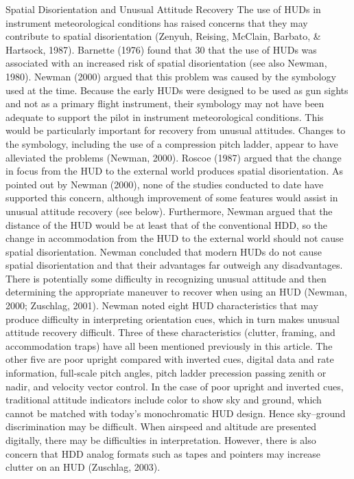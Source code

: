 \documentclass[utf8,bachelor,manualbib]{gradu3}
\begin{document}
Spatial Disorientation and Unusual Attitude Recovery
The use of HUDs in instrument meteorological conditions has raised concerns
that they may contribute to spatial disorientation (Zenyuh, Reising, McClain,
Barbato, \& Hartsock, 1987). Barnette (1976) found that 30%
that the use of HUDs was associated with an increased risk of spatial disorientation
(see also Newman, 1980). Newman (2000) argued that this problem was
caused by the symbology used at the time. Because the early HUDs were designed
to be used as gun sights and not as a primary flight instrument, their
symbology may not have been adequate to support the pilot in instrument meteorological
conditions. This would be particularly important for recovery from
unusual attitudes. Changes to the symbology, including the use of a compression
pitch ladder, appear to have alleviated the problems (Newman, 2000).
Roscoe (1987) argued that the change in focus from the HUD to the external
world produces spatial disorientation. As pointed out by Newman (2000), none
of the studies conducted to date have supported this concern, although improvement
of some features would assist in unusual attitude recovery (see below).
Furthermore, Newman argued that the distance of the HUD would be at least
that of the conventional HDD, so the change in accommodation from the HUD
to the external world should not cause spatial disorientation. Newman concluded
that modern HUDs do not cause spatial disorientation and that their advantages
far outweigh any disadvantages.
There is potentially some difficulty in recognizing unusual attitude and then determining
the appropriate maneuver to recover when using an HUD (Newman,
2000; Zuschlag, 2001). Newman noted eight HUD characteristics that may produce
difficulty in interpreting orientation cues, which in turn makes unusual attitude
recovery difficult. Three of these characteristics (clutter, framing, and
accommodation traps) have all been mentioned previously in this article. The other
five are poor upright compared with inverted cues, digital data and rate information,
full-scale pitch angles, pitch ladder precession passing zenith or nadir, and
velocity vector control.
In the case of poor upright and inverted cues, traditional attitude indicators include
color to show sky and ground, which cannot be matched with today’s monochromatic
HUD design. Hence sky–ground discrimination may be difficult. When
airspeed and altitude are presented digitally, there may be difficulties in interpretation.
However, there is also concern that HDD analog formats such as tapes and
pointers may increase clutter on an HUD (Zuschlag, 2003).
\end{document}

